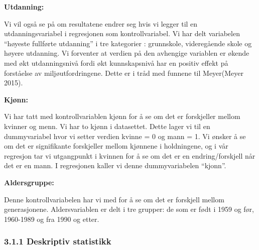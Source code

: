 \documentclass[
  12pt,
  letterpaper,
  DIV=11,
  numbers=noendperiod]{scrartcl}
\begin{document}
\textbf{Utdanning:}

Vi vil også se på om resultatene endrer seg hvis vi legger til en
utdanningsvariabel i regresjonen som kontrollvariabel. Vi har delt
variabelen ``høyeste fullførte utdanning'' i tre kategorier :
grunnskole, videregående skole og høyere utdanning. Vi forventer at
verdien på den avhengige variablen er økende med økt utdanningsnivå
fordi økt kunnskapsnivå har en positiv effekt på forståelse av
miljøutfordringene. Dette er i tråd med funnene til Meyer(Meyer 2015).

\textbf{Kjønn:}

Vi har tatt med kontrollvariablen kjønn for å se om det er forskjeller
mellom kvinner og menn. Vi har to kjønn i datasettet. Dette lager vi til
en dummyvariabel hvor vi setter verdien kvinne = 0 og mann = 1. Vi
ønsker å se om det er signifikante forskjeller mellom kjønnene i
holdningene, og i vår regresjon tar vi utgangpunkt i kvinnen for å se om
det er en endring/forskjell når det er en mann. I regresjonen kaller vi
denne dummyvariabelen ``kjonn''.

\textbf{Aldersgruppe:}

Denne kontrollvariabelen har vi med for å se om det er forskjell mellom
generasjonene. Aldersvariablen er delt i tre grupper: de som er født i
1959 og før, 1960-1989 og fra 1990 og etter.

\newpage

\hypertarget{deskriptiv-statistikk}{%
\subsubsection{3.1.1 Deskriptiv
statistikk}\label{deskriptiv-statistikk}}
\end{document}
